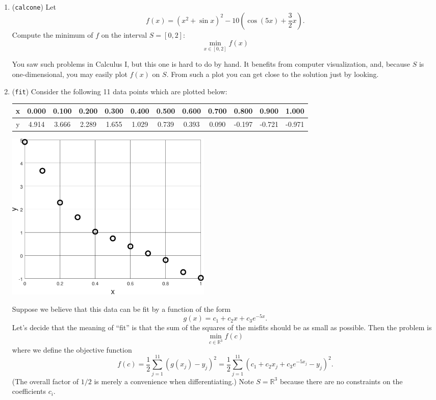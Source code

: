 \documentclass[11pt]{amsart}
\newcommand{\RR}{\mathbb{R}}
\begin{document}
\bigskip
\renewcommand{\labelenumi}{\arabic{enumi}. \quad}
\begin{enumerate}
\item (\texttt{calcone})  \quad Let
    $$f(x) = \left(x^2 + \sin x\right)^2 - 10 \left(\cos(5 x) + \frac{3}{2} x\right).$$
Compute the minimum of $f$ on the interval $S=[0,2]$:
    $$\min_{x\in [0,2]} f(x)$$

You saw such problems in Calculus I, but this one is hard to do by hand.  It benefits from computer visualization, and, because $S$ is one-dimensional, you may easily plot $f(x)$ on $S$.  From such a plot you can get close to the solution just by looking.


\bigskip
\item (\texttt{fit})  \quad Consider the following 11 data points which are plotted below:

\bigskip
\begin{tabular}{c|ccccccccccc}
x & 0.000 & 0.100 & 0.200 & 0.300 & 0.400 & 0.500 & 0.600 & 0.700 &  0.800 &  0.900 &  1.000 \\
\hline
y & 4.914 & 3.666 & 2.289 & 1.655 & 1.029 & 0.739 & 0.393 & 0.090 & -0.197 & -0.721 & -0.971
\end{tabular}

\bigskip
\begin{center}
\includegraphics[width=0.45\textwidth]{fitdata}
\end{center}

\medskip
Suppose we believe that this data can be fit by a function of the form
    $$g(x) = c_1 + c_2 x + c_3 e^{-5 x}.$$
Let's decide that the meaning of ``fit'' is that the sum of the squares of the misfits should be as small as possible.  Then the problem is
	$$\min_{c \in \RR^3} f(c)$$
where we define the objective function 
	$$f(c) = \frac{1}{2} \sum_{j=1}^{11} \left(g(x_j) - y_j\right)^2 = \frac{1}{2} \sum_{j=1}^{11} \left(c_1 + c_2 x_j + c_3 e^{-5 x_j} - y_j\right)^2.$$
(The overall factor of $1/2$ is merely a convenience when differentiating.)  Note $S=\RR^3$ because there are no constraints on the coefficients $c_i$.


\end{enumerate}
\end{document}
